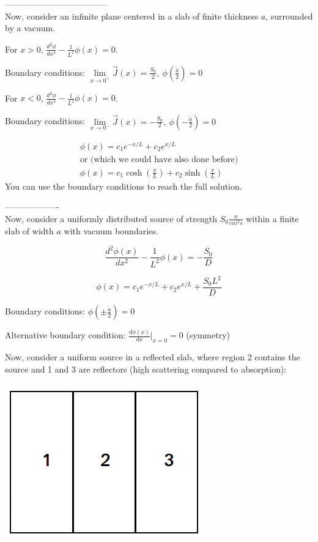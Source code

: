 \documentclass[12pt]{article}
\begin{document}
------------------------------------\\
Now, consider an infinite plane centered in a slab of finite thickness $a$, surrounded by a vacuum.


For $x > 0$, $\frac{d^2\phi}{dx^2} - \frac{1}{L^2}\phi(x) = 0$.


Boundary conditions: 
$\lim\limits_{x\rightarrow 0^+}\vec{J}(x) = \frac{S_0}{2}, \: \phi(\tfrac{\tilde{a}}{2}) = 0$

For $x < 0$, $\frac{d^2\phi}{dx^2} - \frac{1}{L^2}\phi(x) = 0$.

Boundary conditions: 
$\lim\limits_{x\rightarrow 0^-}\vec{J}(x) = -\frac{S_0}{2}, \: \phi(-\tfrac{\tilde{a}}{2}) = 0$

\begin{gather*}
\phi(x) = c_1e^{-x/L} + c_2e^{x/L} \\
\text{or (which we could have also done before)} \\
\phi(x) = c_1\cosh(\tfrac{x}{L}) + c_2\sinh(\tfrac{x}{L})
\end{gather*}
%
You can use the boundary conditions to reach the full solution.


-------------------\\
Now, consider a uniformly distributed source of strength $S_0 \tfrac{n}{cm^3s}$ within a finite slab of
width $a$ with vacuum boundaries.

\begin{equation*}
\frac{d^2\phi(x)}{dx^2} - \frac{1}{L^2}\phi(x) = -\frac{S_0}{D}
\end{equation*}

\begin{equation*}
\phi(x) = c_1e^{-x/L} + c_2e^{x/L} + \frac{S_0L^2}{D}
\end{equation*}

Boundary conditions: $\phi(\pm\tfrac{\tilde{a}}{2}) = 0$


Alternative boundary condition: $\frac{d\phi(x)}{dx}\Bigr|_{x = 0} = 0$ (symmetry)


Now, consider a uniform source in a reflected slab, where region 2 contains the source and 1 and 3 are reflectors (high scattering compared to absorption):

\begin{center}
\includegraphics[height=2.5 in]{../figs/ref_slab}
\end{center}
\end{document}
